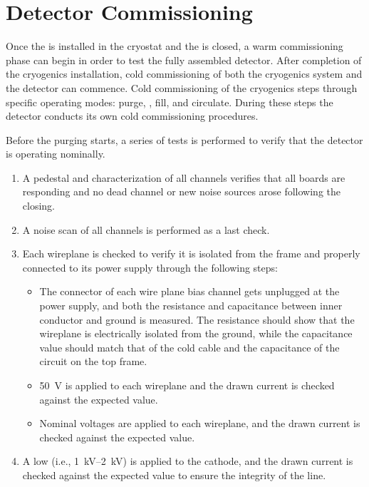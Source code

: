 \section{Detector Commissioning}
\label{sec:fdsp-tc-commiss}


Once the  is installed in the cryostat and the  is closed, a warm commissioning phase can begin in order to test the fully assembled detector.  After completion of the cryogenics installation, cold commissioning of both the cryogenics system and the detector can commence. Cold commissioning of the cryogenics steps through specific operating modes: purge, \cooldown, fill, and circulate. During these steps the detector conducts its own cold commissioning procedures. 
 

Before the purging starts, a series of tests is performed to verify that the detector is operating nominally. 

\begin{enumerate}

    \item A pedestal and  characterization of all  channels verifies that all   boards are responding and no dead channel or new noise sources arose following the  closing.
    
    \item A noise scan of all  channels is performed as a last check. %

    \item Each  wireplane is checked to verify it is isolated from the  frame and properly connected to its  power supply through the following steps:
    
\begin{itemize}

    \item The  connector of each wire plane bias channel gets unplugged at the power supply, and both the resistance and capacitance between inner conductor and ground is measured. 
    The resistance should show that the wireplane is electrically isolated from the ground, while the capacitance value should match that of the cold  cable and the capacitance of the circuit on the  top frame.

    \item \SI{50}{V} is applied to each wireplane and the drawn current is checked against the expected value.
    
    \item Nominal voltages are applied to each wireplane, and the  drawn current is checked against the expected value. 
    
\end{itemize}

    \item A low  (i.e., \SIrange{1}{2}{kV}) is applied to the cathode, and the drawn current is checked against the expected value to ensure the integrity of the  line.

\end{enumerate}


